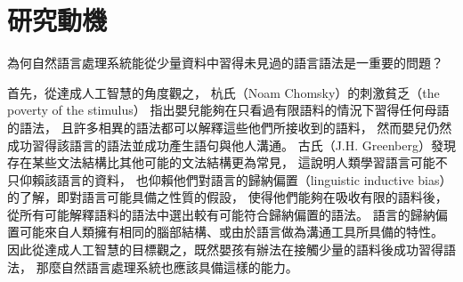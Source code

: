 \section{研究動機}

\iffalse
讓電腦理解人類語言，是幾乎所有從事人工智慧的研究者們最終的目標。
近年來，巨量資料與硬體資源的進步大幅推動了自然語言處理的發展。
1957年佛氏 （John Rupert Firth）\cite{Firth1957ASO}所提倡的分布假說（distributional hypothesis）：
``You shall know a word by the company it keeps''.
為基於分佈語義學（distributional semantics）的方法提供了理論基礎；
2014年米氏（Tomas Mikolov）提出的文字向量（word2vec）\cite{Mikolov2013DistributedRO}
到2018年彼氏\cite{peters-etal-2018-deep}與戴氏\cite{devlin-etal-2019-bert}先後提出的上下文化詞向量（contextualized word representations），
其訓練所使用的語料愈來愈龐雜，模型參數愈大，
於下游任務（downstream task）如詞性標注（part-of-speech tagging）、句法剖析（syntactic parsing）、語意角色標注（semantic role labeling）、問答系統（question answering）等的表現愈佳。

而巨量資料需要大模型的表現力（expressiveness）來加以建模，才有用武之地；
大模型的巨量參數則需要巨量資料才不致過擬合（overfitting）；兩者相輔相成，缺一不可。

但是只有少數常見語言如英文、中文等存在巨量資料供模型訓練，而這些語言僅佔地球上所有語言的5\%；
占比95\%的資料不足語言（low-resource languages）卻無法直接套用需要巨量資料的大參數模型而在下游任務中獲得與常見語言同樣的進步。
幸而語言儘管表面形式（surface form）不一，深層結構卻驚人地相似\cite{greenberg1963universals}，
因此出現許多研究致力於將多語言訓練（multilingual training）在其他資料充足語言（high-resource languages）上的模型轉移（transfer）到資料不足語言，
希望能藉助資料充足語言與資料不足語言的相似性，提高資料不足語言上的任務表現。
\fi

為何自然語言處理系統能從少量資料中習得未見過的語言語法是一重要的問題？

首先，從達成人工智慧的角度觀之，
杭氏（Noam Chomsky）的刺激貧乏（the poverty of the stimulus）\cite{chomsky1980rules}
指出嬰兒能夠在只看過有限語料的情況下習得任何母語的語法，
且許多相異的語法都可以解釋這些他們所接收到的語料，
然而嬰兒仍然成功習得該語言的語法並成功產生語句與他人溝通。
古氏（J.H. Greenberg）\cite{greenberg1963universals}發現存在某些文法結構比其他可能的文法結構更為常見，
這說明人類學習語言可能不只仰賴該語言的資料，
也仰賴他們對語言的歸納偏置（linguistic inductive bias）的了解，即對語言可能具備之性質的假設，
使得他們能夠在吸收有限的語料後，從所有可能解釋語料的語法中選出較有可能符合歸納偏置的語法。
語言的歸納偏置可能來自人類擁有相同的腦部結構、或由於語言做為溝通工具所具備的特性\cite{Zipf1949HumanBA}。
因此從達成人工智慧的目標觀之，既然嬰孩有辦法在接觸少量的語料後成功習得語法，
那麼自然語言處理系統也應該具備這樣的能力。

